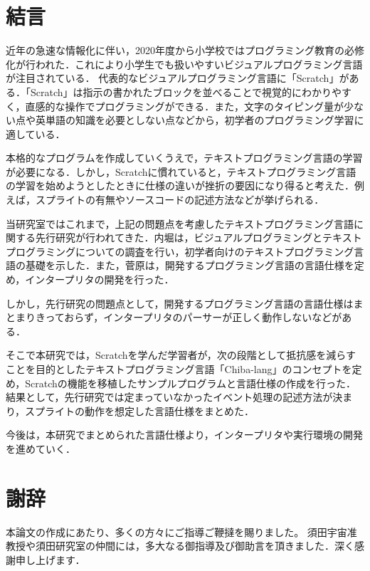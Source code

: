 \documentclass[10pt,a4j]{ltjsarticle}
\begin{document}
\section{結言}
近年の急速な情報化に伴い，2020年度から小学校ではプログラミング教育の必修化が行われた．これにより小学生でも扱いやすいビジュアルプログラミング言語が注目されている．
代表的なビジュアルプログラミング言語に「Scratch」がある．「Scratch」は指示の書かれたブロックを並べることで視覚的にわかりやすく，直感的な操作でプログラミングができる．また，文字のタイピング量が少ない点や英単語の知識を必要としない点などから，初学者のプログラミング学習に適している．

本格的なプログラムを作成していくうえで，テキストプログラミング言語の学習が必要になる．しかし，Scratchに慣れていると，テキストプログラミング言語の学習を始めようとしたときに仕様の違いが挫折の要因になり得ると考えた．例えば，スプライトの有無やソースコードの記述方法などが挙げられる．

当研究室ではこれまで，上記の問題点を考慮したテキストプログラミング言語に関する先行研究が行われてきた．内堀は，ビジュアルプログラミングとテキストプログラミングについての調査を行い，初学者向けのテキストプログラミング言語の基礎を示した\cite{senkou1}．また，菅原は，開発するプログラミング言語の言語仕様を定め，インタープリタの開発を行った\cite{senkou2}．

しかし，先行研究の問題点として，開発するプログラミング言語の言語仕様はまとまりきっておらず，インタープリタのパーサーが正しく動作しないなどがある．

そこで本研究では，Scratchを学んだ学習者が，次の段階として抵抗感を減らすことを目的としたテキストプログラミング言語「Chiba-lang」のコンセプトを定め，Scratchの機能を移植したサンプルプログラムと言語仕様の作成を行った．
結果として，先行研究では定まっていなかったイベント処理の記述方法が決まり，スプライトの動作を想定した言語仕様をまとめた．

今後は，本研究でまとめられた言語仕様より，インタープリタや実行環境の開発を進めていく．
\clearpage

\section{謝辞}
本論文の作成にあたり、多くの方々にご指導ご鞭撻を賜りました。
須田宇宙准教授や須田研究室の仲間には，多大なる御指導及び御助言を頂きました．深く感謝申し上げます．
\clearpage
\end{document}
